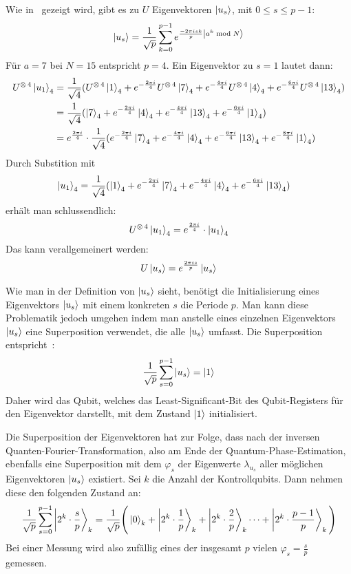 Wie in~\cite[227]{nielsen_chuang_2010} gezeigt wird, gibt es zu \(U\) Eigenvektoren \(\ket{u_s}\), 
mit \(0 \leq s \leq p-1\): 
\[\ket{u_s} =
\frac{1}{\sqrt{p}}
\sum_{k=0}^{p-1} e^{\frac{-2 \pi i s k}{p}\ket{a^k \bmod N}} 
\]
Für \(a=7\) bei \(N=15\) entspricht \(p=4\).
Ein Eigenvektor zu \(s=1\) lautet dann:
\begin{align*}
    U^{\operatorname{\otimes} 4}\ket{u_1}_4 &=
    \frac{1}{\sqrt{4}}(
        U^{\operatorname{\otimes} 4}\ket{1}_4 + 
        e^{-\frac{2 \pi i}{4}}U^{\operatorname{\otimes} 4}\ket{7}_4 + 
        e^{-\frac{4 \pi i}{4}}U^{\operatorname{\otimes} 4}\ket{4}_4+ 
        e^{-\frac{6 \pi i}{4}}U^{\operatorname{\otimes} 4}\ket{13}_4
    )\\
    &=
    \frac{1}{\sqrt{4}}(
        \ket{7}_4 + 
        e^{-\frac{2 \pi i}{4}}\ket{4}_4 + 
        e^{-\frac{4 \pi i}{4}}\ket{13}_4+ 
        e^{-\frac{6 \pi i}{4}}\ket{1}_4
    )\\
    &=
    e^{\frac{2 \pi i}{4}}
    \cdot
    \frac{1}{\sqrt{4}}(
        e^{-\frac{2 \pi i}{4}}\ket{7}_4 + 
        e^{-\frac{4 \pi i}{4}}\ket{4}_4 + 
        e^{-\frac{6 \pi i}{4}}\ket{13}_4+ 
        e^{-\frac{8 \pi i}{4}}\ket{1}_4
    )
\end{align*}
Durch Substition mit
\begin{align*}
    \ket{u_1}_4 &=
    \frac{1}{\sqrt{4}}(
        \ket{1}_4 + 
        e^{-\frac{2 \pi i}{4}}\ket{7}_4 + 
        e^{-\frac{4 \pi i}{4}}\ket{4}_4+ 
        e^{-\frac{6 \pi i}{4}}\ket{13}_4
    )
\end{align*}
erhält man schlussendlich:
\begin{align*}
    U^{\operatorname{\otimes} 4}\ket{u_1}_4 
    =e^{\frac{2 \pi i}{4}} \cdot
    \ket{u_1}_4
\end{align*}
Das kann verallgemeinert werden:
\[U\ket{u_s} = e^{\frac{2 \pi i s}{p}}\ket{u_s}\]

Wie man in der Definition von \(\ket{u_s}\) 
sieht, 
benötigt die Initialisierung eines Eigenvektors \(\ket{u_s}\) mit einem konkreten \(s\) die Periode \(p\).
Man kann diese Problematik jedoch umgehen indem man anstelle eines einzelnen Eigenvektors \(\ket{u_s}\)
eine Superposition verwendet, die alle \(\ket{u_s}\) umfasst.
Die Superposition entspricht~\autocite[227]{nielsen_chuang_2010}:
\[\frac{1}{\sqrt{p}} \sum_{s=0}^{p-1}\ket{u_s} = \ket{1}\] 
Daher wird das Qubit, welches das Least-Significant-Bit des Qubit-Registers für den Eigenvektor darstellt, 
mit dem Zustand \(\ket{1}\) initialisiert.

Die Superposition der Eigenvektoren hat zur Folge, 
dass nach der inversen Quanten-Fourier-Transformation, also am Ende der Quantum-Phase-Estimation,
ebenfalls eine Superposition mit dem \(\varphi_s\) der Eigenwerte \(\lambda_{u_s}\) aller möglichen Eigenvektoren \(\ket{u_s}\) existiert.
Sei \(k\) die Anzahl der Kontrollqubits. 
Dann nehmen diese den folgenden Zustand an:
\[
    \frac{1}{\sqrt{p}} \sum_{s=0}^{p-1}\ket{2^k \cdot \frac{s}{p}}_k   = 
    \frac{1}{\sqrt{p}} \Bigg(\ket{0}_k  + \ket{2^k \cdot \frac{1}{p}}_k + \ket{2^k \cdot \frac{2}{p}}_k  \dotsb + \ket{2^k \cdot \frac{p-1}{p}}_k \Bigg)
\]
Bei einer Messung wird also zufällig eines der insgesamt \(p\) vielen \(\varphi_s = \frac{s}{p}\) gemessen.

